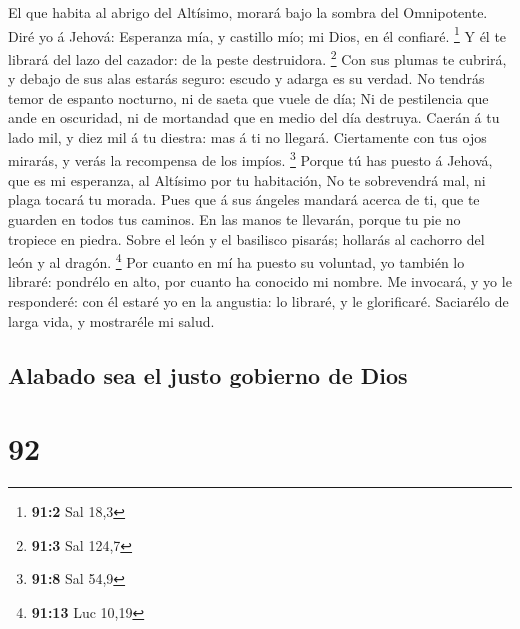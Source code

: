  El que habita al abrigo del Altísimo, morará bajo la sombra
del Omnipotente.  Diré yo á Jehová: Esperanza mía, y
castillo mío; mi Dios, en él confiaré. \footnote{\textbf{91:2} Sal 18,3}
 Y él te librará del lazo del cazador: de la peste
destruidora. \footnote{\textbf{91:3} Sal 124,7}  Con sus
plumas te cubrirá, y debajo de sus alas estarás seguro: escudo y adarga
es su verdad.  No tendrás temor de espanto nocturno, ni de
saeta que vuele de día;  Ni de pestilencia que ande en
oscuridad, ni de mortandad que en medio del día destruya. 
Caerán á tu lado mil, y diez mil á tu diestra: mas á ti no llegará.
 Ciertamente con tus ojos mirarás, y verás la recompensa de
los impíos. \footnote{\textbf{91:8} Sal 54,9}  Porque tú has
puesto á Jehová, que es mi esperanza, al Altísimo por tu habitación,
 No te sobrevendrá mal, ni plaga tocará tu morada.
 Pues que á sus ángeles mandará acerca de ti, que te
guarden en todos tus caminos.  En las manos te llevarán,
porque tu pie no tropiece en piedra.  Sobre el león y el
basilisco pisarás; hollarás al cachorro del león y al dragón.
\footnote{\textbf{91:13} Luc 10,19}  Por cuanto en mí ha
puesto su voluntad, yo también lo libraré: pondrélo en alto, por cuanto
ha conocido mi nombre.  Me invocará, y yo le responderé:
con él estaré yo en la angustia: lo libraré, y le glorificaré.
 Saciarélo de larga vida, y mostraréle mi salud.

\hypertarget{alabado-sea-el-justo-gobierno-de-dios}{%
\subsection{Alabado sea el justo gobierno de
Dios}\label{alabado-sea-el-justo-gobierno-de-dios}}

\hypertarget{section-91}{%
\section{92}\label{section-91}}

